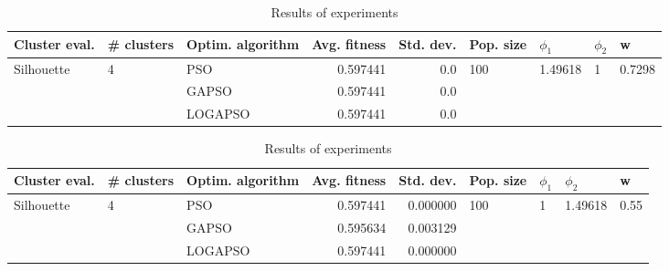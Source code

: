 \documentclass{article}
\begin{document}
\begin{table}
\centering
\caption{Results of experiments}
\begin{tabular}{lllrrllll}
\toprule
              Cluster eval. &        \# clusters & Optim. algorithm &  Avg. fitness &  Std. dev. &            Pop. size &               $\phi_{1}$ &         $\phi_{2}$ &                       w \\
\midrule
\multirow{3}{*}{Silhouette} & \multirow{3}{*}{4} &              PSO &      0.597441 &        0.0 & \multirow{3}{*}{100} & \multirow{3}{*}{1.49618} & \multirow{3}{*}{1} & \multirow{3}{*}{0.7298} \\
                            &                    &            GAPSO &      0.597441 &        0.0 &                      &                          &                    &                         \\
                            &                    &          LOGAPSO &      0.597441 &        0.0 &                      &                          &                    &                         \\
\bottomrule
\end{tabular}
\end{table}
\begin{table}
\centering
\caption{Results of experiments}
\begin{tabular}{lllrrllll}
\toprule
              Cluster eval. &        \# clusters & Optim. algorithm &  Avg. fitness &  Std. dev. &            Pop. size &         $\phi_{1}$ &               $\phi_{2}$ &                     w \\
\midrule
\multirow{3}{*}{Silhouette} & \multirow{3}{*}{4} &              PSO &      0.597441 &   0.000000 & \multirow{3}{*}{100} & \multirow{3}{*}{1} & \multirow{3}{*}{1.49618} & \multirow{3}{*}{0.55} \\
                            &                    &            GAPSO &      0.595634 &   0.003129 &                      &                    &                          &                       \\
                            &                    &          LOGAPSO &      0.597441 &   0.000000 &                      &                    &                          &                       \\
\bottomrule
\end{tabular}
\end{table}
\end{document}
